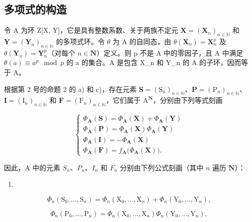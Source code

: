 \subsection{多项式的构造}

令 A 为环 Z{[}X, Y{]}，它是具有整数系数、关于两族不定元 \(\mathbf{X} = (\mathbf{X}_{n})_{n \in \mathbb{N}}\) 和 \(\mathbf{Y} = (\mathbf{Y}_{n})_{n \in \mathbb{N}}\) 的多项式环。令 \(\theta\) 为 A 的自同态，由 \(\theta(\mathbf{X}_{n}) = \mathbf{X}_{n}^{p}\) 及 \(\theta(\mathbf{Y}_{n}) = \mathbf{Y}_{n}^{p}\)（对每个 \(n \in \mathbf{N}\)）定义。则 p 不是 A 中的零因子，且 A 中满足 \(\theta(a) \equiv a^{p} \mod p\) 的 a 的集合。A 是包含 X\_n 和 Y\_n 的 A 的子环，因而等于 A。

 根据第 2 号的命题 2 的 a) 和 c)，存在元素 \(\mathbf{S} = (\mathrm{S}_{n})_{n\in\mathbb{N}}\)、\(\mathbf{P} = (\mathrm{P}_{n})_{n\in\mathbb{N}}\)、\(\mathbf{I} = (\mathrm{I}_{n})_{n\in\mathbb{N}}\) 和 \(\mathbf{F} = (\mathrm{F}_{n})_{n\in\mathbb{N}}\)，它们属于 \(\mathrm{A}^{\mathbf{N}}\)，分别由下列等式刻画

\[
\left\{ \begin{array}{l} \Phi_ {\mathbf {A}} (\mathbf {S}) = \Phi_ {\mathbf {A}} (\mathbf {X}) + \Phi_ {\mathbf {A}} (\mathbf {Y}) \\ \Phi_ {\mathbf {A}} (\mathbf {P}) = \Phi_ {\mathbf {A}} (\mathbf {X}) \Phi_ {\mathbf {A}} (\mathbf {Y}) \\ \Phi_ {\mathbf {A}} (\mathbf {I}) = - \Phi_ {\mathbf {A}} (\mathbf {X}) \\ \Phi_ {\mathbf {A}} (\mathbf {F}) = f _ {\mathbf {A}} \big (\Phi_ {\mathbf {A}} (\mathbf {X}) \big). \end{array} \right.\tag{11}
\]

因此，A 中的元素 \(S_{n}\)、\(P_{n}\)、\(I_{n}\) 和 \(F_{n}\) 分别由下列公式刻画（其中 \(n\) 遍历 \(\mathbf{N}\)）：

\begin{enumerate}
\def\labelenumi{(\arabic{enumi})}
\setcounter{enumi}{11}
\tightlist
\item
\end{enumerate}

\[
\Phi_ {n} \left(\mathrm{S} _ {0}, \dots , \mathrm{S} _ {n}\right) = \Phi_ {n} \left(\mathrm{X} _ {0}, \dots , \mathrm{X} _ {n}\right) + \Phi_ {n} \left(\mathrm{Y} _ {0}, \dots , \mathrm{Y} _ {n}\right),\tag{13}
\]

\[
\Phi_ {n} \left(\mathrm{P} _ {0}, \dots , \mathrm{P} _ {n}\right) = \Phi_ {n} \left(\mathrm{X} _ {0}, \dots , \mathrm{X} _ {n}\right) \Phi_ {n} \left(\mathrm{Y} _ {0}, \dots , \mathrm{Y} _ {n}\right),\tag{14}
\]

